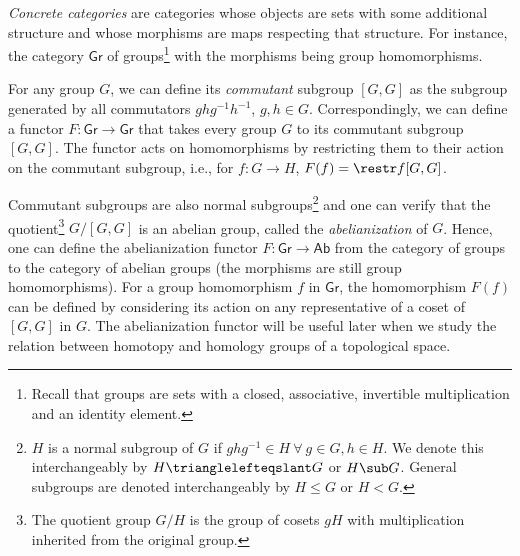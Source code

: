 \emph{Concrete categories} are categories whose objects are sets
with some additional structure and whose morphisms are maps respecting
that structure. For instance, the category $\mathsf{Gr}$ of groups\footnote{Recall that groups are sets with a closed, associative, invertible
multiplication and an identity element.} with the morphisms being group homomorphisms.
\begin{example}
    For any group $G$, we can define its \emph{commutant} subgroup
    $[G,G]$ as the subgroup generated by all commutators $ghg^{-1}h^{-1}$, $g,h\in G$.
    Correspondingly, we can define a functor $F:\mathsf{Gr}\rightarrow\mathsf{Gr}$
    that takes every group $G$ to its commutant subgroup $[G,G]$. The
    functor acts on homomorphisms by restricting them to their action
    on the commutant subgroup, i.e., for $f:G\rightarrow H$, $F(f)=\restr f{[G,G]}$.

    Commutant subgroups are also normal subgroups\footnote{$H$ is a normal subgroup of $G$ if $ghg^{-1}\in H~\forall~g\in G,h\in H$. We denote this interchangeably by $H \trianglelefteqslant G$ or $H \sub G$. General subgroups are denoted interchangeably by $H\leq G$ or $H<G$.\index{$<$}}
    and one can verify that the quotient\footnote{The quotient group $G/H$ is the group of cosets $gH$
    with multiplication inherited from the original group.} $G/[G,G]$ is an abelian group, called the \emph{abelianization}
    of $G$. Hence, one can define the abelianization functor
    $F:\mathsf{Gr}\rightarrow\mathsf{Ab}$ from the category of groups
    to the category of abelian groups (the morphisms are still group homomorphisms).
    For a group homomorphism $f$ in $\mathsf{Gr}$, the homomorphism
    $F(f)$ can be defined by considering its action on any representative
    of a coset of $[G,G]$ in
    $G$. The abelianization functor will be useful later when we study
    the relation between homotopy and homology groups of a topological
    space.
\end{example}
%
